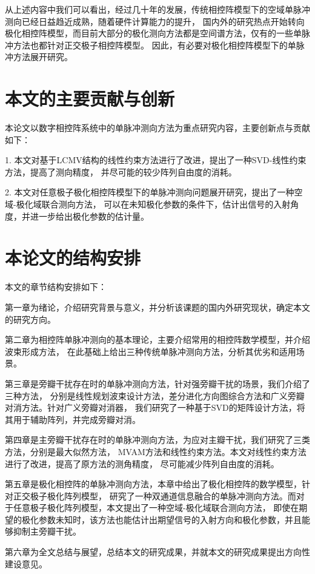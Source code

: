 \documentclass[master]{thesis-uestc}
\begin{document}
从上述内容中我们可以看出，经过几十年的发展，传统相控阵模型下的空域单脉冲测向已经日益趋近成熟，随着硬件计算能力的提升，
国内外的研究热点开始转向极化相控阵模型，而目前大部分的极化测向方法都是空间谱方法，仅有的一些单脉冲方法也都针对正交极子相控阵模型。
因此，有必要对极化相控阵模型下的单脉冲方法展开研究。

\section{本文的主要贡献与创新}
本论文以数字相控阵系统中的单脉冲测向方法为重点研究内容，主要创新点与贡献如下：

1. 本文对基于LCMV结构的线性约束方法进行了改进，提出了一种SVD-线性约束方法，提高了测向精度，
并尽可能的较少阵列自由度的消耗。

2. 本文对任意极子极化相控阵模型下的单脉冲测向问题展开研究，提出了一种空域-极化域联合测向方法，
可以在未知极化参数的条件下，估计出信号的入射角度，并进一步给出极化参数的估计量。

\section{本论文的结构安排}
本文的章节结构安排如下：

第一章为绪论，介绍研究背景与意义，并分析该课题的国内外研究现状，确定本文的研究方向。

第二章为相控阵单脉冲测向的基本理论，主要介绍常用的相控阵数学模型，并介绍波束形成方法，
在此基础上给出三种传统单脉冲测向方法，分析其优劣和适用场景。

第三章是旁瓣干扰存在时的单脉冲测向方法，针对强旁瓣干扰的场景，我们介绍了三种方法，
分别是线性规划波束设计方法，差分进化方向图综合方法和广义旁瓣对消方法。针对广义旁瓣对消器，
我们研究了一种基于SVD的矩阵设计方法，将其用于辅助阵列，并完成旁瓣对消。

第四章是主旁瓣干扰存在时的单脉冲测向方法，为应对主瓣干扰，我们研究了三类方法，分别是最大似然方法，
MVAM方法和线性约束方法。本文对线性约束方法进行了改进，提高了原方法的测角精度，
尽可能减少阵列自由度的消耗。

第五章是极化相控阵的单脉冲测向方法，本章中给出了极化相控阵的数学模型，针对正交极子极化阵列模型，
研究了一种双通道信息融合的单脉冲测向方法。而对于任意极子极化阵列模型，本文提出了一种空域-极化域联合测向方法，
即使在期望的极化参数未知时，该方法也能估计出期望信号的入射方向和极化参数，并且能够抑制主旁瓣干扰。

第六章为全文总结与展望，总结本文的研究成果，并就本文的研究成果提出方向性建设意见。
\end{document}
